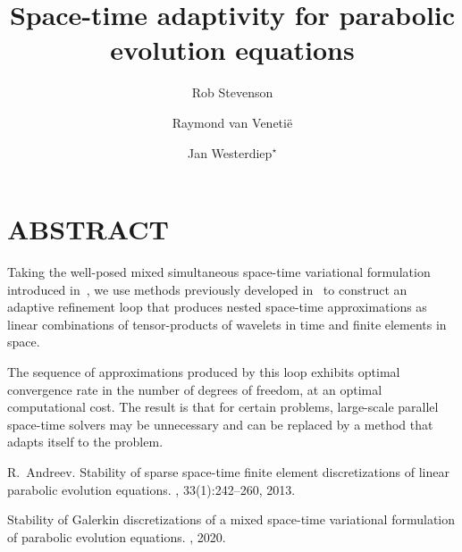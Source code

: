 \documentclass[12pt]{amsart}
\title{Space-time adaptivity for parabolic evolution equations}
\author{Rob Stevenson \and Raymond van Veneti\"e \and Jan Westerdiep$^\star$}
\begin{document}
\maketitle

\section*{ABSTRACT}


Taking the well-posed mixed simultaneous space-time variational formulation
introduced in~\cite{And13}, we use methods previously developed in~\cite{SW20}
to construct an adaptive refinement loop that produces nested space-time
approximations as linear combinations of tensor-products of wavelets in time and
finite elements in space.

The sequence of approximations produced by this loop exhibits optimal convergence
rate in the number of degrees of freedom, at an optimal computational cost. The
result is that for certain problems, large-scale parallel space-time solvers may
be unnecessary and can be replaced by a method that adapts itself to the problem.

\begin{thebibliography}{99}

R.~Andreev.
\newblock Stability of sparse space-time finite element discretizations of
 linear parabolic evolution equations.
, 33(1):242--260, 2013.

\newblock Stability of Galerkin discretizations of a mixed space-time variational
   formulation of parabolic evolution equations.
, 2020.

\end{thebibliography}
\end{document}
